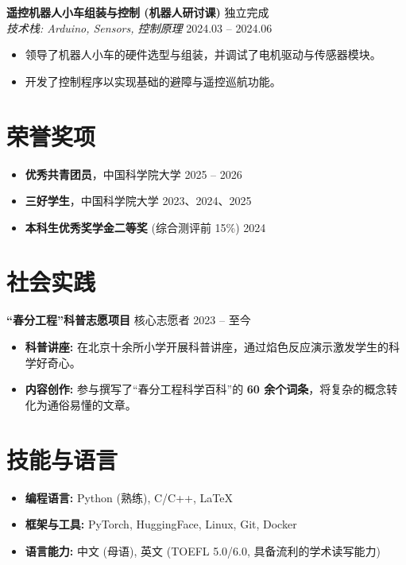 \documentclass[11pt,a4paper]{article}
\begin{document}
\textbf{遥控机器人小车组装与控制 (机器人研讨课)} \hfill 独立完成 \\
\textit{技术栈: Arduino, Sensors, 控制原理} \hfill 2024.03 -- 2024.06
\begin{itemize}
    \item 领导了机器人小车的硬件选型与组装，并调试了电机驱动与传感器模块。
    \item 开发了控制程序以实现基础的避障与遥控巡航功能。
\end{itemize}

\section{荣誉奖项}
\begin{itemize}
    \item \textbf{优秀共青团员}，中国科学院大学 \hfill 2025 -- 2026
    \item \textbf{三好学生}，中国科学院大学 \hfill 2023、2024、2025
    \item \textbf{本科生优秀奖学金二等奖} (综合测评前 15\%) \hfill 2024
\end{itemize}

\section{社会实践}
\textbf{“春分工程”科普志愿项目} \hfill 核心志愿者 \hfill 2023 -- 至今
\begin{itemize}
    \item \textbf{科普讲座:} 在北京十余所小学开展科普讲座，通过焰色反应演示激发学生的科学好奇心。
    \item \textbf{内容创作:} 参与撰写了“春分工程科学百科”的 \textbf{60 余个词条}，将复杂的概念转化为通俗易懂的文章。
\end{itemize}

\section{技能与语言}
\begin{itemize}
    \item \textbf{编程语言:} Python (熟练), C/C++, LaTeX
    \item \textbf{框架与工具:} PyTorch, HuggingFace, Linux, Git, Docker
    \item \textbf{语言能力:} 中文 (母语), 英文 (TOEFL 5.0/6.0, 具备流利的学术读写能力)
\end{itemize}
\end{document}
